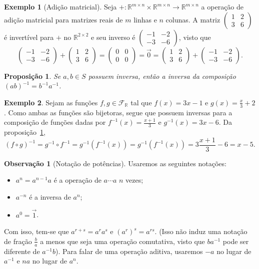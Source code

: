 \documentclass[a4paper,12pt]{article}
\theoremstyle{plain}
\newtheorem{proposicao}{Proposição}[section]
\theoremstyle{definition}
\newtheorem{observacao}{Observação}[section]
\newtheorem{exemplo}{Exemplo}[section]
\begin{document}
\begin{exemplo}[Adição matricial]
	Seja $+: \mathbb{R}^{m\times n}\times\mathbb{R}^{m\times n}\longrightarrow\mathbb{R}^{m\times n}$ a operação de adição matricial para matrizes reais de $m$ linhas e $n$ colunas. A matriz $\begin{pmatrix}
		1&2\\3&6
	\end{pmatrix}$ é invertível para $+$ no $\mathbb{R}^{2\times 2}$ e seu inverso é $\begin{pmatrix}
	-1&-2\\-3&-6
\end{pmatrix}$, visto que
$$
\begin{pmatrix}
	-1&-2\\-3&-6
\end{pmatrix}
+\begin{pmatrix}
	1&2\\3&6
\end{pmatrix}
=
\begin{pmatrix}
	0&0\\0&0
\end{pmatrix}
=\vec 0 = \begin{pmatrix}
	1&2\\3&6
\end{pmatrix}
+\begin{pmatrix}
	-1&-2\\-3&-6
\end{pmatrix}.
$$
\end{exemplo}

\begin{proposicao}\label{prop:compinv}
	Se \(a,b\in S\) possuem inversa, então a inversa da composição \((ab)^{-1} = b^{-1}a^{-1}\).
\end{proposicao}

\begin{exemplo}
	Sejam as funções $f,g\in \mathcal{F}_\mathbb{R}$ tal que $f(x) = 3x-1$ e $g(x) = \frac x 3 + 2$. Como ambas as funções são bijetoras, segue que possuem inversas para a composição de funções dadas por $f^{-1}(x) = \frac{x+1}3$ e $g^{-1}(x) = 3x - 6$. Da proposição~\ref{prop:compinv}, $$(f\circ g)^{-1} = g^{-1}\circ f^{-1} = g^{-1}(f^{-1}(x)) = g^{-1}(f^{-1}(x)) = 3\frac{x + 1}3 - 6 = x - 5.$$
\end{exemplo}

\begin{observacao}[Notação de potências]
	Usaremos as seguintes notações:
	\begin{itemize}
		\item \(a^n = a^{n-1}a\) é a operação de \(a\dotsb a\) \(n\) vezes;
		\item \(a^{-n}\) é a inversa de \(a^n\);
		\item \(a^0 = \vec{1}\).
	\end{itemize}
	Com isso, tem-se que \(a^{r+s} = a^ra^s\) e \((a^r)^s = a^{rs}\). (Isso
	não induz uma notação de fração \(\frac{b}{a}\) a menos que seja uma operação
	comutativa, visto que \(ba^{-1}\) pode ser diferente de \(a^{-1}b\)).
	Para falar de uma operação aditiva, usaremos \(-a\) no lugar de
	\(a^{-1}\) e \(na\) no lugar de \(a^n\).
\end{observacao}
\end{document}

